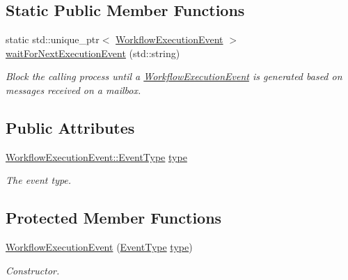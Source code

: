 \subsection*{Static Public Member Functions}
\begin{DoxyCompactItemize}
\item 
static std\+::unique\+\_\+ptr$<$ \hyperlink{classwrench_1_1_workflow_execution_event}{Workflow\+Execution\+Event} $>$ \hyperlink{classwrench_1_1_workflow_execution_event_a7fc291240789553aa1a02ac693b858ba}{wait\+For\+Next\+Execution\+Event} (std\+::string)
\begin{DoxyCompactList}\small\item\em Block the calling process until a \hyperlink{classwrench_1_1_workflow_execution_event}{Workflow\+Execution\+Event} is generated based on messages received on a mailbox. \end{DoxyCompactList}\end{DoxyCompactItemize}
\subsection*{Public Attributes}
\begin{DoxyCompactItemize}
\item 
\mbox{\label{classwrench_1_1_workflow_execution_event_ace095d03737f181e628babdd4ee0e851}} 
\hyperlink{classwrench_1_1_workflow_execution_event_a5611165191fbc4d121d1b141c748a448}{Workflow\+Execution\+Event\+::\+Event\+Type} \hyperlink{classwrench_1_1_workflow_execution_event_ace095d03737f181e628babdd4ee0e851}{type}
\begin{DoxyCompactList}\small\item\em The event type. \end{DoxyCompactList}\end{DoxyCompactItemize}
\subsection*{Protected Member Functions}
\begin{DoxyCompactItemize}
\item 
\hyperlink{classwrench_1_1_workflow_execution_event_a0dfd003b0dee653b1b21175f94fd9208}{Workflow\+Execution\+Event} (\hyperlink{classwrench_1_1_workflow_execution_event_a5611165191fbc4d121d1b141c748a448}{Event\+Type} \hyperlink{classwrench_1_1_workflow_execution_event_ace095d03737f181e628babdd4ee0e851}{type})
\begin{DoxyCompactList}\small\item\em Constructor. \end{DoxyCompactList}\end{DoxyCompactItemize}


